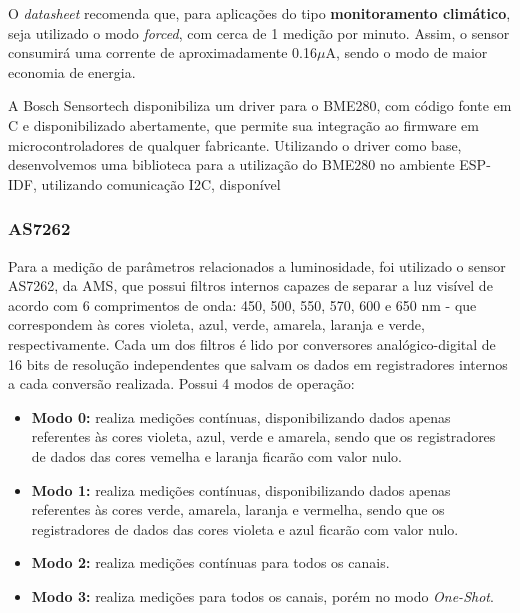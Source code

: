 \documentclass[../monografia.tex]{subfiles}
\begin{document}
O \textit{datasheet} recomenda que, para aplicações do tipo \textbf{monitoramento climático}, seja utilizado o modo \textit{forced}, com cerca de 1 medição por minuto. Assim, o sensor consumirá uma corrente de aproximadamente 0.16$\mu$A, sendo o modo de maior economia de energia. 

A Bosch Sensortech disponibiliza um driver para o BME280, com código fonte em C e disponibilizado abertamente\cite{bme280-driver}, que permite sua integração ao firmware em microcontroladores de qualquer fabricante. 
Utilizando o driver como base, desenvolvemos uma biblioteca para a utilização do BME280 no ambiente ESP-IDF, utilizando comunicação I2C, disponível



\subsubsection{AS7262} \label{as7262}

Para a medição de parâmetros relacionados a luminosidade, foi utilizado o sensor AS7262, da AMS, que possui filtros internos capazes de separar a luz visível de acordo com 6 comprimentos de onda: 450, 500, 550, 570, 600 e 650 nm - que correspondem às cores violeta, azul, verde, amarela, laranja e verde, respectivamente. Cada um dos filtros é lido por conversores analógico-digital de 16 bits de resolução independentes que salvam os dados em registradores internos a cada conversão realizada. Possui 4 modos de operação:

\begin{itemize}
	\item \textbf{Modo 0:} realiza medições contínuas, disponibilizando dados apenas referentes às cores violeta, azul, verde e amarela, sendo que os registradores de dados das cores vemelha e laranja ficarão com valor nulo.
	\item \textbf{Modo 1:} realiza medições contínuas, disponibilizando dados apenas referentes às cores verde, amarela, laranja e vermelha, sendo que os registradores de dados das cores violeta e azul ficarão com valor nulo.
	\item \textbf{Modo 2:} realiza medições contínuas para todos os canais.
	\item \textbf{Modo 3:} realiza medições para todos os canais, porém no modo \textit{One-Shot}.
\end{itemize}
\end{document}
